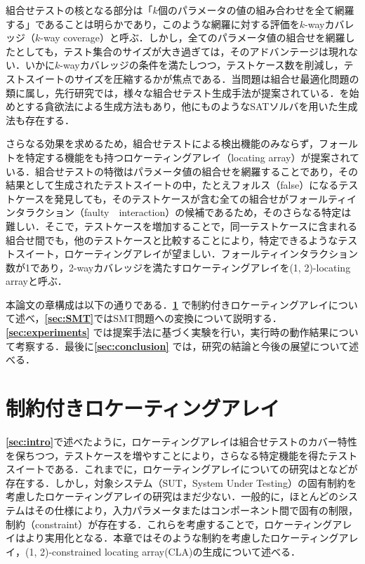 \documentclass[paper]{ieicej}
\begin{document}
組合せテストの核となる部分は「$k$個のパラメータの値の組み合わせを全て網羅する」であることは明らかであり，このような網羅に対する評価を$k$-wayカバレッジ（$k$-way coverage）と呼ぶ．しかし，全てのパラメータ値の組合せを網羅したとしても，テスト集合のサイズが大き過ぎては，そのアドバンテージは現れない．いかに$k$-wayカバレッジの条件を満たしつつ，テストケース数を削減し，テストスイートのサイズを圧縮するかが焦点である．当問題は組合せ最適化問題の類に属し，先行研究では，様々な組合せテスト生成手法が提案されている．\cite{AETG}を始めとする貪欲法による生成方法もあり，他にも\cite{SATpairwise}のようなSATソルバを用いた生成法も存在する．

さらなる効果を求めるため，組合せテストによる検出機能のみならず，フォールトを特定する機能をも持つロケーティングアレイ（locating array）が提案されている\cite{colbourn}．組合せテストの特徴はパラメータ値の組合せを網羅することであり，その結果として生成されたテストスイートの中，たとえフォルス（false）になるテストケースを発見しても，そのテストケースが含む全ての組合せがフォールティインタラクション（faulty　interaction）の候補であるため，そのさらなる特定は難しい．そこで，テストケースを増加することで，同一テストケースに含まれる組合せ間でも，他のテストケースと比較することにより，特定できるようなテストスイート，ロケーティングアレイが望ましい．フォールティインタラクション数が1であり，2-wayカバレッジを満たすロケーティングアレイを(1, 2)-locating arrayと呼ぶ．

本論文の章構成は以下の通りである．{\bfseries \ref{sec:cla}} で制約付きロケーティングアレイについて述べ，{\bfseries \ref{sec:SMT}}ではSMT問題への変換について説明する．{\bfseries\ref{sec:experiments}} では提案手法に基づく実験を行い，実行時の動作結果について考察する．最後に{\bfseries \ref{sec:conclusion}} では，研究の結論と今後の展望について述べる．

\section{制約付きロケーティングアレイ}
\label{sec:cla}

{\bfseries\ref{sec:intro}}で述べたように，ロケーティングアレイは組合せテストのカバー特性を保ちつつ，テストケースを増やすことにより，さらなる特定機能を得たテストスイートである．これまでに，ロケーティングアレイについての研究は\cite{KonishiSAT}と\cite{Nagamoto}などが存在する．しかし，対象システム（SUT，System Under Testing）の固有制約を考慮したロケーティングアレイの研究はまだ少ない．一般的に，ほとんどのシステムはその仕様により，入力パラメータまたはコンポーネント間で固有の制限，制約（constraint）が存在する．これらを考慮することで，ロケーティングアレイはより実用化となる．本章ではそのような制約を考慮したロケーティングアレイ，(1, 2)-constrained locating array(CLA)の生成について述べる．
\end{document}
